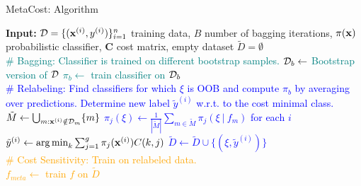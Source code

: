 \documentclass[11pt,compress,t,notes=noshow, aspectratio=169, xcolor=table]{beamer}
\begin{document}
\begin{frame}{MetaCost: Algorithm}
	
		

		
			\begin{algorithmic}
				
				\scriptsize

				\State \textbf{Input:} 
				$\mathcal{D} = \{(\mathbf{x}^{(i)},y^{(i)})\}_{i=1}^n$ training data, $B$ number of bagging iterations,
				$\pi(\mathbf{x})$ probabilistic classifier,
				$\mathbf{C}$ cost matrix, empty dataset $\tilde D = \emptyset$ \\
				 \textcolor{teal}{\# Bagging: Classifier is trained on different bootstrap samples.
    \State $\mathcal{D}_b \leftarrow $ Bootstrap version of $\mathcal{D}$
    \State $\pi_b \leftarrow $ train classifier on $\mathcal{D}_b$ 
\EndFor 
\\
\textcolor{blue}{\# Relabeling: Find classifiers for which $\xi$ is OOB and compute $\pi_b$ by averaging over predictions.
Determine new label $\tilde y^{(i)}$ w.r.t. to the cost minimal class.
 	 \State $\tilde M \leftarrow \bigcup_{m: \mathbf{x}^{(i)} \notin \mathcal{D}_m} \{m\}$ 
\EndFor
        \State $\pi_j(\xi)  \leftarrow \frac{1}{|\tilde M| } \sum_{m \in \tilde M}   \pi_j(\xi~|~ f_m)$ for each $i$ 
    \EndFor
{}
\State $\tilde y^{(i)} \leftarrow \operatorname{arg\,min}_{k} \sum_{j=1}^g \pi_j(\mathbf{x}^{(i)}) C(k,j) $
\State $\tilde D \leftarrow \tilde D \cup \{(\xi,\tilde y^{(i)})\} $
\EndFor}}  
\\
\textcolor{orange}{\# Cost Sensitivity: Train on relabeled data.\\
$f_{meta} \leftarrow$ train $f$ on $\tilde D$}
\end{algorithmic}

\end{frame}
\end{document}
